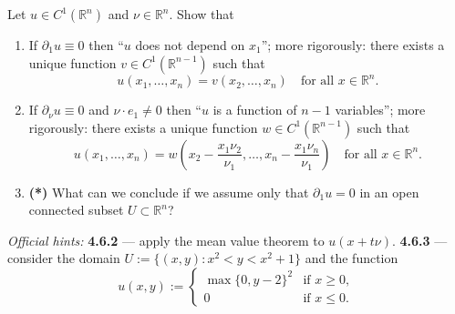 \begin{exercise}
\label{ex:4.6}
Let $u \in C^1(\mathbb{R}^n)$ and $\nu \in \mathbb{R}^n$. Show that
\begin{enumerate}[label=\textbf{\arabic*.}]
  \item If $\partial_1 u \equiv 0$ then ``$u$ does not depend on $x_1$''; more rigorously: there
    exists a unique function $v \in C^1(\mathbb{R}^{n-1})$ such that
    \begin{equation*}
    u(x_1,\dots,x_n) = v(x_2,\dots,x_n) \quad \text{for all } x \in \mathbb{R}^n. \tag{2}
    \end{equation*}
  \item If $\partial_\nu u \equiv 0$ and $\nu\cdot e_1 \neq 0$ then ``$u$ is a function of $n-1$
    variables''; more rigorously: there exists a unique function $w \in C^1(\mathbb{R}^{n-1})$
    such that
    $$u(x_1,\dots,x_n) = w\!\left(x_2 - \frac{x_1\nu_2}{\nu_1}, \dots, x_n - \frac{x_1\nu_n}{\nu_1}\right) \quad \text{for all } x \in \mathbb{R}^n.$$
  \item \textbf{(*)} What can we conclude if we assume only that $\partial_1 u = 0$ in an open
    connected subset $U \subset \mathbb{R}^n$?
\end{enumerate}
\textit{Official hints:} \textbf{4.6.2} --- apply the mean value theorem to $u(x + t\nu)$.
\textbf{4.6.3} --- consider the domain $U := \{(x,y) : x^2 < y < x^2+1\}$ and the function
$$u(x,y) := \begin{cases} \max\{0, y-2\}^2 & \text{if } x \geq 0, \\ 0 & \text{if } x \leq 0.\end{cases}$$
\end{exercise}
